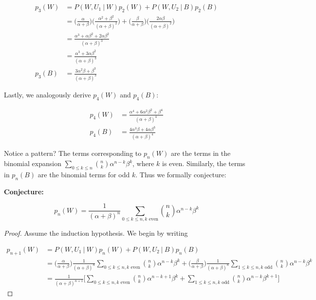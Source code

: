 \documentclass[10pt, oneside]{article}   	%
\theoremstyle{definition}
\begin{document}
\begin{enumerate}[label=3.\arabic*]
\begin{align*}
p_3 (W) &= P(W, U_1 \ | \ W) p_2 (W) + P(W, U_2 \ | \ B) p_2 (B) \\
&= \bigg( \frac{\alpha}{\alpha + \beta} \bigg) \bigg( \frac{\alpha^2 + \beta^2}{(\alpha + \beta)^2} \bigg) + \bigg( \frac{\beta}{\alpha + \beta} \bigg) \bigg( \frac{2\alpha \beta}{(\alpha + \beta)^2} \bigg) \\
&= \frac{\alpha^3 + \alpha \beta^2 + 2\alpha \beta^2}{(\alpha + \beta)^3} \\
&= \boxed{ \frac{\alpha^3 + 3 \alpha \beta^2}{(\alpha + \beta)^3} } \\
p_3 (B) &= \boxed{ \frac{3\alpha^2 \beta + \beta^3}{(\alpha + \beta)^3} }
\end{align*}

Lastly, we analogously derive $p_4 (W)$ and $p_4 (B)$:

\begin{align*}
p_4 (W) &= \boxed{ \frac{\alpha^4 + 6 \alpha^2 \beta^2 + \beta^4}{(\alpha + \beta)^4} } \\
p_4 (B) &= \boxed{ \frac{4\alpha^3 \beta + 4\alpha \beta^3}{(\alpha + \beta)^4} }
\end{align*}

Notice a pattern? The terms corresponding to $p_n(W)$ are the terms in the binomial expansion $\sum_{0 \leq k \leq n} \binom{n}{k} \alpha^{n-k} \beta^k$, where $k$ is even. Similarly, the terms in $p_n (B)$ are the binomial terms for odd $k$. Thus we formally conjecture:

\textbf{Conjecture:}

\[ p_n(W) = \frac{1}{(\alpha + \beta)^n} \sum_{0 \leq k \leq n, k \text{ even}} \binom{n}{k} \alpha^{n - k} \beta^k \]

\begin{proof}
Assume the induction hypothesis. We begin by writing

\begin{align*}
p_{n+1} (W) &= P(W, U_1 \ | \ W) p_n (W) + P(W, U_2 \ | \ B) p_n (B) \\
&= \bigg( \frac{\alpha}{\alpha + \beta} \bigg) \frac{1}{(\alpha + \beta)^n} \sum_{0 \leq k \leq n, k \text{ even}} \binom{n}{k} \alpha^{n - k} \beta^k + \bigg( \frac{\beta}{\alpha + \beta} \bigg) \frac{1}{(\alpha + \beta)^n} \sum_{1 \leq k \leq n, k \text{ odd}} \binom{n}{k} \alpha^{n - k} \beta^k \\
&= \frac{1}{(\alpha + \beta)^{n+1}} \bigg[ \sum_{0 \leq k \leq n, k \text{ even}} \binom{n}{k} \alpha^{n - k + 1} \beta^k + \sum_{1 \leq k \leq n, k \text{ odd}} \binom{n}{k} \alpha^{n - k} \beta^{k+1} \bigg]
\end{align*}


\end{proof}
\end{enumerate}
\end{document}
